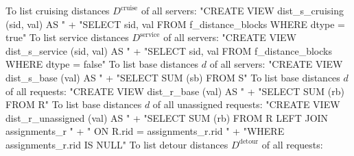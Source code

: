 \nwendcode{}\nwdocspar
To list cruising distances $D^\textrm{cruise}$ of all servers:
\nwenddocs{}\endmoddef{}
"CREATE VIEW dist_s_cruising (sid, val) AS "
  + "SELECT sid, val FROM f_distance_blocks WHERE dtype = true"
\nwendcode{}\nwdocspar
To list service distances $D^\textrm{service}$ of all servers:
\nwenddocs{}\endmoddef{}
"CREATE VIEW dist_s_service (sid, val) AS "
  + "SELECT sid, val FROM f_distance_blocks WHERE dtype = false"
\nwendcode{}\nwdocspar
To list base distances $d$ of all servers:
\nwenddocs{}\endmoddef{}
"CREATE VIEW dist_s_base (val) AS "
  + "SELECT SUM (sb) FROM S"
\nwendcode{}\nwdocspar
To list base distances $d$ of all requests:
\nwenddocs{}\endmoddef{}
"CREATE VIEW dist_r_base (val) AS "
  + "SELECT SUM (rb) FROM R"
\nwendcode{}\nwdocspar
To list base distances $d$ of all unassigned requests:
\nwenddocs{}\endmoddef{}
"CREATE VIEW dist_r_unassigned (val) AS "
  + "SELECT SUM (rb) FROM R LEFT JOIN assignments_r "
  + "  ON R.rid = assignments_r.rid "
  + "WHERE assignments_r.rid IS NULL"
\nwendcode{}\nwdocspar
To list detour distances $D^\textrm{detour}$ of all requests:
\nwenddocs{}\endmoddef{}
